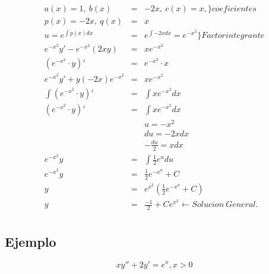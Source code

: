\documentclass{article}
\begin{document}
\begin{eqnarray}
\nonumber a(x) = 1, \ b(x) &=& -2x, \ c(x)=x , \rbrace coeficientes \\
\nonumber p(x) = -2x, \  q(x) &=& x \\
\nonumber u = e^{\int p(x) dx} &=& e^{\int -2x dx} = e^{-x^2} \rbrace Factor integrante\\
\nonumber e^{-x^2}y' -e^{-x^2}(2xy) &=& xe^{-x^2} \\
\nonumber \left( e^{-x^2} \cdot y \right) ' &=& e^{-x^2} \cdot x \\
\nonumber e^{-x^2} y' + y (-2x)  e^{-x^2} &=& x e^{-x^2}\\
\nonumber \int \left( e^{-x^2} \cdot y \right)' &=& \int x e^{-x^2} dx \\
\nonumber \left( e^{-x^2} \cdot y \right)'  &=& \int x e^{-x^2} dx  \\
\nonumber & & u = -x^2 \\
\nonumber & & du	= -2x dx \\
\nonumber & & -\frac{du}{2} = x dx \\
\nonumber e^{-x^2 } y &=& \int \frac{1}{2} e^{u} du\\
\nonumber e^{-x^2} y &=& \frac{1}{2} e^{-x^u} + C \\
\nonumber y &=& e^{x^2} \left(  \frac{1}{2} e^{-x^u} + C \right) \\
\nonumber y &=& \frac{-1}{2} +  C e^{x^2} \leftarrow Solucion \  General. \\
\end{eqnarray}

\subsection{Ejemplo}

 \begin{equation}
 xy'' + 2y' = e^x , x >  0 
 \end{equation}
\end{document}
